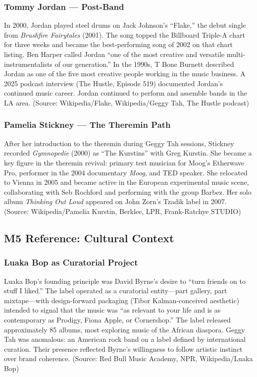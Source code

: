 \documentclass[11pt,letterpaper]{article}
\begin{document}
\subsubsection{Tommy Jordan --- Post-Band}

In 2000, Jordan played steel drums on Jack Johnson's ``Flake,'' the debut single from \textit{Brushfire Fairytales} (2001). The song topped the Billboard Triple-A chart for three weeks and became the best-performing song of 2002 on that chart listing. Ben Harper called Jordan ``one of the most creative and versatile multi-instrumentalists of our generation.'' In the 1990s, T Bone Burnett described Jordan as one of the five most creative people working in the music business. A 2025 podcast interview (The Hustle, Episode 519) documented Jordan's continued music career. Jordan continued to perform and assemble bands in the LA area. (Source: Wikipedia/Flake, Wikipedia/Geggy Tah, The Hustle podcast)

\subsubsection{Pamelia Stickney --- The Theremin Path}

After her introduction to the theremin during Geggy Tah sessions, Stickney recorded \textit{Gymnopedie} (2000) as ``The Kurstins'' with Greg Kurstin. She became a key figure in the theremin revival: primary test musician for Moog's Etherwave Pro, performer in the 2004 documentary \textit{Moog}, and TED speaker. She relocated to Vienna in 2005 and became active in the European experimental music scene, collaborating with Seb Rochford and performing with the group Barbez. Her solo album \textit{Thinking Out Loud} appeared on John Zorn's Tzadik label in 2007. (Source: Wikipedia/Pamelia Kurstin, Berklee, LPR, Frank-Ratchye STUDIO)

\subsection{M5 Reference: Cultural Context}

\subsubsection{Luaka Bop as Curatorial Project}

Luaka Bop's founding principle was David Byrne's desire to ``turn friends on to stuff I liked.'' The label operated as a curatorial entity---part gallery, part mixtape---with design-forward packaging (Tibor Kalman-conceived aesthetic) intended to signal that the music was ``as relevant to your life and is as contemporary as Prodigy, Fiona Apple, or Cornershop.'' The label released approximately 85 albums, most exploring music of the African diaspora. Geggy Tah was anomalous: an American rock band on a label defined by international curation. Their presence reflected Byrne's willingness to follow artistic instinct over brand coherence. (Source: Red Bull Music Academy, NPR, Wikipedia/Luaka Bop)
\end{document}
